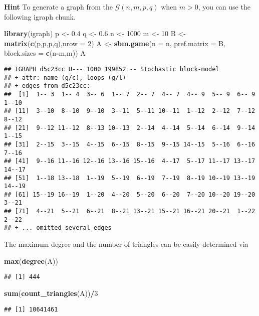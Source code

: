 \documentclass[
]{article}
\newenvironment{Shaded}{\begin{snugshade}}{\end{snugshade}}
\newcommand{\DataTypeTok}[1]{\textcolor[rgb]{0.13,0.29,0.53}{#1}}
\newcommand{\DecValTok}[1]{\textcolor[rgb]{0.00,0.00,0.81}{#1}}
\newcommand{\FloatTok}[1]{\textcolor[rgb]{0.00,0.00,0.81}{#1}}
\newcommand{\KeywordTok}[1]{\textcolor[rgb]{0.13,0.29,0.53}{\textbf{#1}}}
\newcommand{\NormalTok}[1]{#1}
\newcommand{\OperatorTok}[1]{\textcolor[rgb]{0.81,0.36,0.00}{\textbf{#1}}}
\newcommand{\StringTok}[1]{\textcolor[rgb]{0.31,0.60,0.02}{#1}}
\begin{document}
\textbf{Hint} To generate a graph from the \(\mathcal{G}(n,m,p,q)\) when
\(m > 0\), you can use the following igraph chunk.

\begin{Shaded}
\begin{Highlighting}[]
\KeywordTok{library}\NormalTok{(igraph)}
\NormalTok{p <-}\StringTok{ }\FloatTok{0.4}
\NormalTok{q <-}\StringTok{ }\FloatTok{0.6}
\NormalTok{n <-}\StringTok{ }\DecValTok{1000}
\NormalTok{m <-}\StringTok{ }\DecValTok{10}
\NormalTok{B <-}\StringTok{ }\KeywordTok{matrix}\NormalTok{(}\KeywordTok{c}\NormalTok{(p,p,p,q),}\DataTypeTok{nrow =} \DecValTok{2}\NormalTok{)}
\NormalTok{A <-}\StringTok{ }\KeywordTok{sbm.game}\NormalTok{(}\DataTypeTok{n =}\NormalTok{ n, }\DataTypeTok{pref.matrix =}\NormalTok{ B, }\DataTypeTok{block.sizes =} \KeywordTok{c}\NormalTok{(n}\OperatorTok{-}\NormalTok{m,m))}
\NormalTok{A}
\end{Highlighting}
\end{Shaded}

\begin{verbatim}
## IGRAPH d5c23cc U--- 1000 199852 -- Stochastic block-model
## + attr: name (g/c), loops (g/l)
## + edges from d5c23cc:
##  [1]  1-- 3  1-- 4  3-- 6  1-- 7  2-- 7  4-- 7  4-- 9  5-- 9  6-- 9  1--10
## [11]  3--10  8--10  9--10  3--11  5--11 10--11  1--12  2--12  7--12  8--12
## [21]  9--12 11--12  8--13 10--13  2--14  4--14  5--14  6--14  9--14  1--15
## [31]  2--15  3--15  4--15  6--15  8--15  9--15 14--15  5--16  6--16  7--16
## [41]  9--16 11--16 12--16 13--16 15--16  4--17  5--17 11--17 13--17 14--17
## [51]  1--18 13--18  1--19  5--19  6--19  7--19  8--19 10--19 13--19 14--19
## [61] 15--19 16--19  1--20  4--20  5--20  6--20  7--20 10--20 19--20  3--21
## [71]  4--21  5--21  6--21  8--21 13--21 15--21 16--21 20--21  1--22  2--22
## + ... omitted several edges
\end{verbatim}

The maximum degree and the number of triangles can be easily determined
via

\begin{Shaded}
\begin{Highlighting}[]
\KeywordTok{max}\NormalTok{(}\KeywordTok{degree}\NormalTok{(A))}
\end{Highlighting}
\end{Shaded}

\begin{verbatim}
## [1] 444
\end{verbatim}

\begin{Shaded}
\begin{Highlighting}[]
\KeywordTok{sum}\NormalTok{(}\KeywordTok{count_triangles}\NormalTok{(A))}\OperatorTok{/}\DecValTok{3}
\end{Highlighting}
\end{Shaded}

\begin{verbatim}
## [1] 10641461
\end{verbatim}
\end{document}
